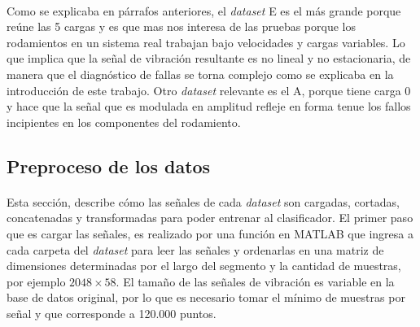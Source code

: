 \documentclass[12pt]{article}%
\begin{document}
\paragraph{}
Como se explicaba en párrafos anteriores, el \textit{dataset} E es el más grande porque reúne las 5 cargas y es que mas nos interesa de las pruebas porque los rodamientos en un sistema real trabajan bajo velocidades y cargas variables. Lo que implica que la señal de vibración resultante es no lineal y no estacionaria, de manera que el diagnóstico de fallas se torna complejo como se explicaba en la introducción de este trabajo. Otro \textit{dataset} relevante es el A, porque tiene carga 0 y hace que la señal que es modulada en amplitud refleje en forma tenue los fallos incipientes en los componentes del rodamiento.

\begin{table}
\caption{Descripción de los data sets del experimento.}
\label{table:tdatasets}
\end{table}

\subsection{Preproceso de los datos}
\label{sec:preproc}

\paragraph{}
Esta sección, describe cómo las señales de cada \textit{dataset} son cargadas, cortadas, concatenadas y transformadas para poder entrenar al clasificador. El primer paso que es cargar las señales, es realizado por una función en MATLAB que ingresa a cada carpeta del \textit{dataset} para leer las señales y ordenarlas en una matriz de dimensiones determinadas por el largo del segmento y la cantidad de muestras, por ejemplo $2048\times58$. El tamaño de las señales de vibración es variable en la base de datos original, por lo que es necesario tomar el mínimo de muestras por señal y que corresponde a 120.000 puntos.
\end{document}
